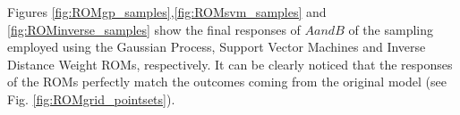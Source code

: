  Figures \ref{fig:ROMgp_samples},\ref{fig:ROMsvm_samples} and \ref{fig:ROMinverse_samples}  show the final responses  of $A and B$ of the sampling employed using the Gaussian Process, Support Vector Machines and Inverse Distance Weight ROMs, respectively. 
It can be clearly noticed that the responses of the ROMs perfectly match the outcomes coming from the original model (see Fig. \ref{fig:ROMgrid_pointsets}).








